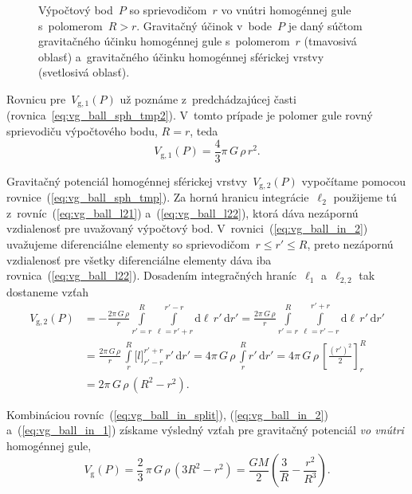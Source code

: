 \documentclass[a4paper, 12pt]{book}
\newcommand{\diff}{\mathrm d}
\newcommand{\gidx}{\mathrm g}
\begin{document}
\begin{figure}
\centering

\caption{Výpočtový bod~$P$ so sprievodičom~$r$ vo vnútri homogénnej gule 
s~polomerom~$R > r$.  Gravitačný účinok v~bode~$P$ je daný súčtom gravitačného 
účinku homogénnej gule s~polomerom~$r$ (tmavosivá oblasť) a~gravitačného účinku 
homogénnej sférickej vrstvy (svetlosivá oblasť).}
\label{fig:homogeneous_ball_in}
\end{figure}

Rovnicu pre~$V_{\gidx,1}(P)$ už poznáme z~predchádzajúcej časti 
(rovnica~\ref{eq:vg_ball_sph_tmp2}).  V~tomto prípade je polomer gule rovný 
sprievodiču výpočtového bodu, $R = r$, teda
%
\begin{equation}
\label{eq:vg_ball_in_1}
V_{\gidx,1}(P) = \frac{4}{3} \pi \, G \, \rho \, r^2{.}
\end{equation}

Gravitačný potenciál homogénnej sférickej vrstvy~$V_{\gidx,2}(P)$ vypočítame 
pomocou rovnice~(\ref{eq:vg_ball_sph_tmp}).  Za hornú hranicu 
integrácie~$\ell_2$ použijeme tú z~rovníc~(\ref{eq:vg_ball_l21}) 
a~(\ref{eq:vg_ball_l22}), ktorá dáva nezápornú vzdialenosť pre uvažovaný 
výpočtový bod.  V~rovnici~(\ref{eq:vg_ball_in_2}) uvažujeme diferenciálne 
elementy so sprievodičom~$r \leq r' \leq R$, preto nezápornú vzdialenosť pre 
všetky diferenciálne elementy dáva iba rovnica~(\ref{eq:vg_ball_l22}).  
Dosadením integračných hraníc~$\ell_1$ a~$\ell_{2,2}$ tak dostaneme vzťah
%
\begin{equation}
\begin{split}
V_{\gidx,2}(P) &= -\frac{2\pi \, G \, \rho}{r} \int\limits_{r' = r}^R 
\int\limits_{\ell = r' + r}^{r' - r} \diff \ell \, r' \, \diff r' = \frac{2\pi 
\, G \, \rho}{r} \int\limits_{r' = r}^R \int\limits_{\ell = r' - r}^{r' + r} 
\diff \ell \, r' \, \diff r'\\
%
&= \frac{2\pi \, G \, \rho}{r} \,  \int\limits_{r}^R \big[ l \big]_{r' - r}^{r' 
+ r} \, r'  \, \diff r' = 4\pi \, G \, \rho \,  \int\limits_{r}^R r'  \, \diff 
r' = 4\pi \, G \, \rho \,  \left[ \frac{(r')^2}{2} \right]_{r}^R\\
%
&= 2\pi \, G \, \rho \,  (R^2 - r^2){.}
\end{split}
\end{equation}

Kombináciou rovníc~(\ref{eq:vg_ball_in_split}), (\ref{eq:vg_ball_in_2}) 
a~(\ref{eq:vg_ball_in_1}) získame výsledný vzťah pre gravitačný potenciál 
\emph{vo vnútri} homogénnej gule,
%
\begin{equation}
\label{eq:vg_ball_in}
V_\gidx(P) = \frac{2}{3} \, \pi \, G \, \rho \, (3 R^2 - r^2) = \frac{GM}{2} 
\left( \frac{3}{R} - \frac{r^2}{R^3} \right){.}
\end{equation}
\end{document}
